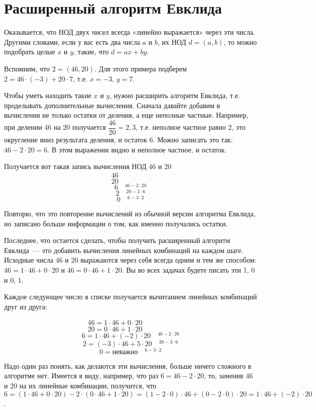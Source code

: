 \documentclass{article}
\begin{document}
    \section{Расширенный алгоритм Евклида}
    Оказывается, что НОД двух чисел всегда «линейно выражается» через эти числа.
    Другими словами, если у вас есть два числа $a$ и $b$, их НОД $d = (a, b)$, то можно подобрать целые
    $x$ и $y$, такие, что $d = ax + by$.

    Вспомним, что $2 = (46, 20)$.
    Для этого примера подберем $2 = 46\cdot(-3) + 20\cdot7$, т.е. $x=-3$, $y=7$.

    Чтобы уметь находить такие $x$ и $y$, нужно расширить алгоритм Евклида, т.е. проделывать дополнительные вычисления. Сначала давайте добавим в вычисления не только остатки от деления, а еще неполные частные. Например, при делении 46 на 20 получается $\dfrac{46}{20} = 2,3$, т.е. неполное частное равно 2, это округление вниз результата деления, и остаток 6. Можно записать это так: $46 - 2\cdot20 = 6$. В этом выражении видно и неполное частное, и остаток.

    Получается вот такая запись вычисления НОД 46 и 20
    \[46 \quad {}^{\phantom{10-10\cdot10}}\]
    \[20 \quad {}^{\phantom{10-10\cdot10}}\]
    \[6 \quad {}^{46 - 2\cdot20}\]
    \[2 \quad {}^{20 - 3\cdot6}\]
    \[0 \quad {}^{6 - 3\cdot2}\]

    Повторю, что это повторение вычислений из обычной версии алгоритма Евклида, но записано больше информации о том, как именно получались остатки.

    Последнее, что остается сделать, чтобы получить расширенный алгоритм Евклида~--- это добавить вычисления линейных комбинаций на каждом шаге. Исходные числа 46 и 20 выражаются через себя всегда одним и тем же способом: $46 = 1\cdot46+0\cdot20$ и $46 = 0\cdot46+1\cdot20$. Вы во всех задачах будете писать эти 1, 0 и 0, 1.

    \pagebreak

    Каждое следующее число в списке получается вычитанием линейных комбинаций друг из друга:

    \[46 = 1\cdot46+0\cdot20 \quad {}^{\phantom{10-10\cdot10}}\]
    \[20 = 0\cdot46+1\cdot20 \quad {}^{\phantom{10-10\cdot10}}\]
    \[6 = 1\cdot46+(-2)\cdot20 \quad {}^{46 - 2\cdot20}\]
    \[2 = (-3)\cdot46+5\cdot20 \quad {}^{20 - 3\cdot6}\]
    \[0 = \mbox{неважно} \quad {}^{6 - 3\cdot2}\]

    Надо один раз понять, как делаются эти вычисления, больше ничего сложного в алгоритме нет.
    Имеется в виду, например, что раз $6 = 46 - 2\cdot20$, то, заменив 46 и 20 на их линейные комбинации, получится, что $6 = (1\cdot46+0\cdot20) - 2\cdot(0\cdot46+1\cdot20) = (1 - 2\cdot 0)\cdot46 + (0-2\cdot0)\cdot20=1\cdot46+(-2)\cdot20$.
\end{document}
